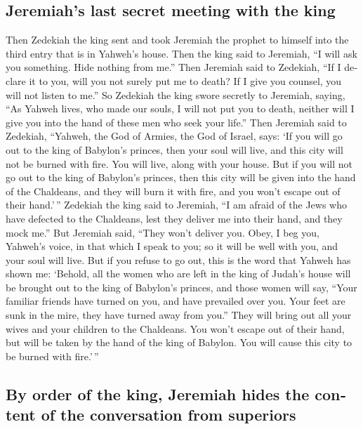\begin{paracol}{2}
\begin{otherlanguage}{english}
\hypertarget{jeremiahs-last-secret-meeting-with-the-king}{%
\subsection{Jeremiah's last secret meeting with the
king}\label{jeremiahs-last-secret-meeting-with-the-king}}

 Then Zedekiah the king sent and took Jeremiah the
prophet to himself into the third entry that is in Yahweh's house. Then
the king said to Jeremiah, ``I will ask you something. Hide nothing from
me.''  Then Jeremiah said to Zedekiah, ``If I declare it
to you, will you not surely put me to death? If I give you counsel, you
will not listen to me.''  So Zedekiah the king swore
secretly to Jeremiah, saying, ``As Yahweh lives, who made our souls, I
will not put you to death, neither will I give you into the hand of
these men who seek your life.''  Then Jeremiah said to
Zedekiah, ``Yahweh, the God of Armies, the God of Israel, says: `If you
will go out to the king of Babylon's princes, then your soul will live,
and this city will not be burned with fire. You will live, along with
your house.  But if you will not go out to the king of
Babylon's princes, then this city will be given into the hand of the
Chaldeans, and they will burn it with fire, and you won't escape out of
their hand.'\,''  Zedekiah the king said to Jeremiah, ``I
am afraid of the Jews who have defected to the Chaldeans, lest they
deliver me into their hand, and they mock me.''  But
Jeremiah said, ``They won't deliver you. Obey, I beg you, Yahweh's
voice, in that which I speak to you; so it will be well with you, and
your soul will live.  But if you refuse to go out, this
is the word that Yahweh has shown me:  `Behold, all the
women who are left in the king of Judah's house will be brought out to
the king of Babylon's princes, and those women will say, ``Your familiar
friends have turned on you, and have prevailed over you. Your feet are
sunk in the mire, they have turned away from you.''  They
will bring out all your wives and your children to the Chaldeans. You
won't escape out of their hand, but will be taken by the hand of the
king of Babylon. You will cause this city to be burned with fire.'\,''

\hypertarget{by-order-of-the-king-jeremiah-hides-the-content-of-the-conversation-from-superiors}{%
\subsection{By order of the king, Jeremiah hides the content of the
conversation from
superiors}\label{by-order-of-the-king-jeremiah-hides-the-content-of-the-conversation-from-superiors}}


\end{otherlanguage}
\end{paracol}
